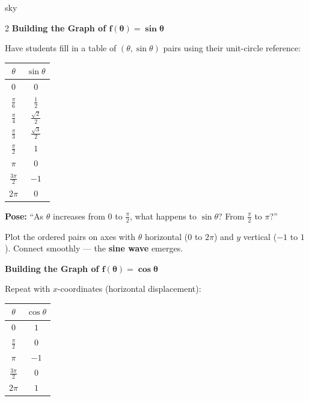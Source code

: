 \documentclass[10pt]{article}
\begin{document}
\begin{skillbox}[Lesson]{sky}
\begin{multicols}{2}
    \textbf{Building the Graph of $\boldsymbol{f(\theta)=\sin\theta}$}

    \vspace{4pt}
    Have students fill in a table of $(\theta,\sin\theta)$ pairs using their unit-circle
    reference:

    \vspace{4pt}
    \renewcommand{\arraystretch}{1.3}
    \begin{tabular}{@{}c|c@{}}
        $\theta$ & $\sin\theta$ \\\hline
        $0$               & $0$ \\
        $\tfrac{\pi}{6}$  & $\tfrac{1}{2}$ \\
        $\tfrac{\pi}{4}$  & $\tfrac{\sqrt{2}}{2}$ \\
        $\tfrac{\pi}{3}$  & $\tfrac{\sqrt{3}}{2}$ \\
        $\tfrac{\pi}{2}$  & $1$ \\
        $\pi$             & $0$ \\
        $\tfrac{3\pi}{2}$ & $-1$ \\
        $2\pi$            & $0$ \\
    \end{tabular}

    \vspace{6pt}
    \textbf{Pose:} ``As $\theta$ increases from $0$ to $\tfrac{\pi}{2}$, what happens to
    $\sin\theta$? From $\tfrac{\pi}{2}$ to $\pi$?''

    Plot the ordered pairs on axes with $\theta$ horizontal ($0$ to $2\pi$) and $y$ vertical
    ($-1$ to $1$). Connect smoothly --- the \textbf{sine wave} emerges.

    \columnbreak

    \textbf{Building the Graph of $\boldsymbol{f(\theta)=\cos\theta}$}

    \vspace{4pt}
    Repeat with $x$-coordinates (horizontal displacement):

    \vspace{4pt}
    \begin{tabular}{@{}c|c@{}}
        $\theta$ & $\cos\theta$ \\\hline
        $0$               & $1$ \\
        $\tfrac{\pi}{2}$  & $0$ \\
        $\pi$             & $-1$ \\
        $\tfrac{3\pi}{2}$ & $0$ \\
        $2\pi$            & $1$ \\
    \end{tabular}


\end{multicols}
\end{skillbox}
\end{document}
